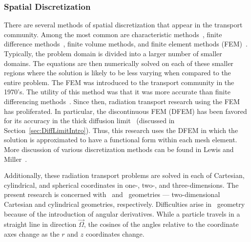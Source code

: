 \documentclass{article}
\begin{document}
\subsubsection{Spatial Discretization}
\label{subsec:SpatialDiscretization}
There are several methods of spatial discretization that appear in the transport community. Among the most common are characteristic methods~\cite{AdamsCharacteristicMethods}, finite difference methods~\cite{Lewis_Comp_Methods_Neu_Trans}, finite volume methods, and finite element methods (FEM)~\cite{Lewis_Comp_Methods_Neu_Trans}. Typically, the problem domain is divided into a larger number of smaller domains. The equations are then numerically solved on each of these smaller regions where the solution is likely to be less varying when compared to the entire problem. The FEM was introduced to the transport community in the 1970's. The utility of this method was that it was more accurate than finite differencing methods~\cite{ReedTriangularMesh}. Since then, radiation transport research using the FEM has proliferated. In particular, the discontinuous FEM (DFEM) has been favored for its accuracy in the thick diffusion limit~\cite{LarsenAsymptotic} (discussed in Section~\ref{sec:DiffLimitIntro}). Thus, this research uses the DFEM in which the solution is approximated to have a functional form within each mesh element. More discussion of various discretization methods can be found in Lewis and Miller~\cite{Lewis_Comp_Methods_Neu_Trans}.

Additionally, these radiation transport problems are solved in each of Cartesian, cylindrical, and spherical coordinates in one-, two-, and three-dimensions. The present research is concerned with \XY\ and \RZ\ geometries ---  two-dimensional Cartesian and cylindrical geometries, respectively. Difficulties arise in \RZ\ geometry because of the introduction of angular derivatives. While a particle travels in a straight line in direction $\vec{\Omega}$, the cosines of the angles relative to the coordinate axes change as the $r$ and $z$ coordinates change.

\end{document}
